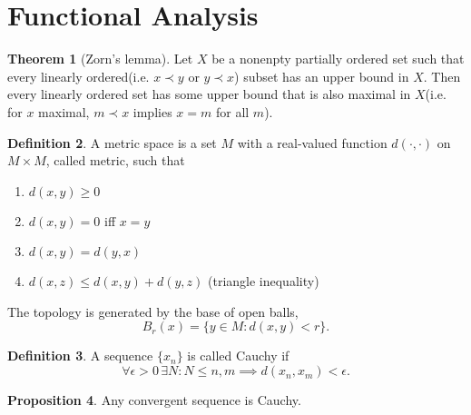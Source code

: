 \documentclass[twocolumn]{article}
\theoremstyle{definition}
\newtheorem{definition}{Definition}[section]
\newtheorem{theorem}[definition]{Theorem}
\newtheorem{proposition}[definition]{Proposition}
\theoremstyle{remark}
\begin{document}
\section{Functional Analysis}

\begin{theorem}[Zorn's lemma]
    Let $X$ be a nonenpty partially ordered set such that every linearly ordered(i.e. $x \prec y$ or $y \prec x$) subset
    has an upper bound in $X$. Then every linearly ordered set has some upper bound that is also maximal in $X$(i.e. for $x$ maximal, $m \prec x$ implies $x = m$ for all $m$).
\end{theorem}
\begin{definition}
    A metric space is a set $M$ with a real-valued function $d(\cdot,\cdot)$ on $M \times M$, called metric, such that
    \begin{enumerate}[noitemsep]
        \item $d(x, y) \geq 0$
        \item $d(x, y) = 0$ iff $x = y$
        \item $d(x, y) = d(y, x)$
        \item $d(x, z) \leq d(x, y) + d(y, z)$ (triangle inequality)
    \end{enumerate}
    The topology is generated by the base of open balls,
    \begin{equation}
        B_r(x) = \{ y \in M : d(x, y) < r\}.
    \end{equation}
\end{definition}
\begin{definition}
    A sequence $\{x_n\}$ is called Cauchy if
    \begin{equation}
        \forall \epsilon > 0 \, \exists N: N \leq n, m \implies d(x_n, x_m) < \epsilon.
    \end{equation}
\end{definition}
\begin{proposition}
    Any convergent sequence is Cauchy.
\end{proposition}
\end{document}
